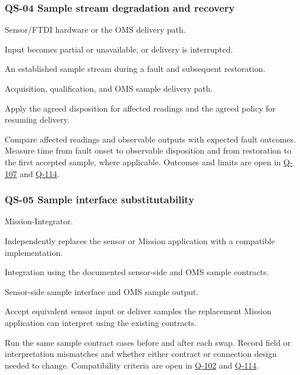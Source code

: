 \subsubsection{QS-04 Sample stream degradation and recovery}
\label{Scenario:QS-04}
\begin{description}[leftmargin=0pt,labelindent=0pt,labelsep=0pt,style=nextline]
\item[Stimulus source] Sensor/FTDI hardware or the OMS delivery path.
\item[Stimulus] Input becomes partial or unavailable, or delivery is interrupted.
\item[Environment] An established sample stream during a fault and subsequent restoration.
\item[Artifact] Acquisition, qualification, and OMS sample delivery path.
\item[Response] Apply the agreed disposition for affected readings and the agreed policy for resuming delivery.
\item[Response measure] Compare affected readings and observable outputs with expected fault outcomes. Measure time from fault onset to observable disposition and from restoration to the first accepted sample, where applicable. Outcomes and limits are open in \hyperref[Question:Q-107]{Q-107} and \hyperref[Question:Q-114]{Q-114}.
\end{description}

\subsubsection{QS-05 Sample interface substitutability}
\label{Scenario:QS-05}
\begin{description}[leftmargin=0pt,labelindent=0pt,labelsep=0pt,style=nextline]
\item[Stimulus source] Mission-Integrator.
\item[Stimulus] Independently replaces the sensor or Mission application with a compatible implementation.
\item[Environment] Integration using the documented sensor-side and OMS sample contracts.
\item[Artifact] Sensor-side sample interface and OMS sample output.
\item[Response] Accept equivalent sensor input or deliver samples the replacement Mission application can interpret using the existing contracts.
\item[Response measure] Run the same sample contract cases before and after each swap. Record field or interpretation mismatches and whether either contract or connection design needed to change. Compatibility criteria are open in \hyperref[Question:Q-102]{Q-102} and \hyperref[Question:Q-114]{Q-114}.
\end{description}

